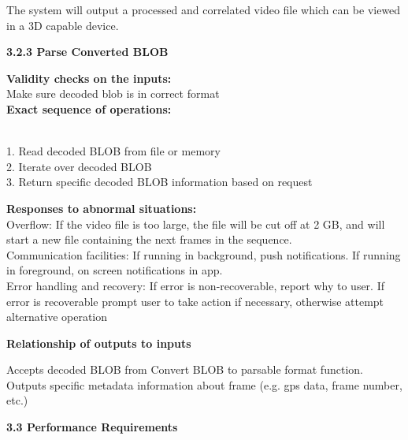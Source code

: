 \documentclass[10pt,draftclsnofoot,onecolumn]{IEEEtran}
\begin{document}
The system will output a processed and correlated video file which can be viewed in a 3D capable device. \\
\vspace{5mm}

{\Medium\textbf{3.2.3 Parse Converted BLOB}} \\
\vspace{5mm}

 
 \textbf{Validity checks on the inputs:}\\
  \vspace{5mm}
Make sure decoded blob is in correct format\\
 \vspace{5mm}
\textbf{Exact sequence of operations: }\\\\
 \vspace{5mm}

1. Read decoded BLOB from file or memory\\
2. Iterate over decoded BLOB\\
3. Return specific decoded BLOB information based on request\\

 \vspace{5mm}

\textbf{Responses to abnormal situations:}\\
 \vspace{5mm}
 Overflow: If the video file is too large, the file will be cut off at 2 GB, and will start a new file containing the next frames in the sequence. \\
 Communication facilities: If running in background, push notifications. If running in foreground, on screen notifications in app. \\
 Error handling and recovery: If error is non-recoverable, report why to user. If error is recoverable prompt user to take action if necessary, otherwise attempt alternative operation

 \vspace{5mm}
\textbf{Relationship of outputs to inputs }\\
 \vspace{5mm}

Accepts decoded BLOB from Convert BLOB to parsable format function. Outputs specific metadata information about frame (e.g. gps data, frame number, etc.)
 \\\vspace{5mm}
 
 
 {\Medium\textbf{3.3 Performance Requirements}} \\
  \\\vspace{5mm}
\end{document}
